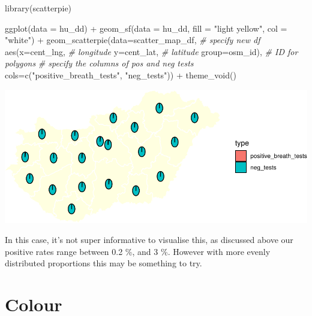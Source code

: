 \documentclass[
]{book}
\makeatletter
\newenvironment{Shaded}{\begin{snugshade}}{\end{snugshade}}
\newcommand{\AttributeTok}[1]{\textcolor[rgb]{0.61,0.61,0.61}{#1}}
\newcommand{\CommentTok}[1]{\textcolor[rgb]{0.37,0.37,0.37}{\textit{#1}}}
\newcommand{\FunctionTok}[1]{\textcolor[rgb]{0,0,0}{#1}}
\newcommand{\NormalTok}[1]{#1}
\newcommand{\SpecialCharTok}[1]{\textcolor[rgb]{0,0,0}{#1}}
\newcommand{\StringTok}[1]{\textcolor[rgb]{0.5,0.5,0.5}{#1}}
\newenvironment{kframe}{%
\medskip{}
\setlength{\fboxsep}{.8em}
 \def\at@end@of@kframe{}%
 \ifinner\ifhmode%
  \def\at@end@of@kframe{\end{minipage}}%
  \begin{minipage}{\columnwidth}%
 \fi\fi%
 \def\FrameCommand##1{\hskip\@totalleftmargin \hskip-\fboxsep
 \colorbox{shadecolor}{##1}\hskip-\fboxsep
     \hskip-\linewidth \hskip-\@totalleftmargin \hskip\columnwidth}%
 \MakeFramed {\advance\hsize-\width
   \@totalleftmargin\z@ \linewidth\hsize
   \@setminipage}}%
 {\par\unskip\endMakeFramed%
 \at@end@of@kframe}
\renewenvironment{Shaded}{\begin{kframe}}{\end{kframe}}
\makeatother
\begin{document}
\begin{Shaded}
\begin{Highlighting}[]
\FunctionTok{library}\NormalTok{(scatterpie)}

\FunctionTok{ggplot}\NormalTok{(}\AttributeTok{data =}\NormalTok{ hu\_dd) }\SpecialCharTok{+} 
  \FunctionTok{geom\_sf}\NormalTok{(}\AttributeTok{data =}\NormalTok{ hu\_dd, }
          \AttributeTok{fill =} \StringTok{"light yellow"}\NormalTok{, }
          \AttributeTok{col =} \StringTok{"white"}\NormalTok{) }\SpecialCharTok{+} 
  \FunctionTok{geom\_scatterpie}\NormalTok{(}\AttributeTok{data=}\NormalTok{scatter\_map\_df,   }\CommentTok{\# specify new df}
                  \FunctionTok{aes}\NormalTok{(}\AttributeTok{x=}\NormalTok{cent\_lng,        }\CommentTok{\# longitude}
                      \AttributeTok{y=}\NormalTok{cent\_lat,        }\CommentTok{\# latitude}
                      \AttributeTok{group=}\NormalTok{osm\_id),     }\CommentTok{\# ID for polygons}
                  \CommentTok{\# specify the columns of pos and neg tests}
                  \AttributeTok{cols=}\FunctionTok{c}\NormalTok{(}\StringTok{"positive\_breath\_tests"}\NormalTok{, }\StringTok{"neg\_tests"}\NormalTok{)) }\SpecialCharTok{+} 
  \FunctionTok{theme\_void}\NormalTok{()}
\end{Highlighting}
\end{Shaded}

\includegraphics{crime_mapping_files/figure-latex/unnamed-chunk-156-1.pdf}

In this case, it's not super informative to visualise this, as discussed above our positive rates range between 0.2 \%, and 3 \%. However with more evenly distributed proportions this may be something to try.

\hypertarget{colour}{%
\section{Colour}\label{colour}}
\end{document}
